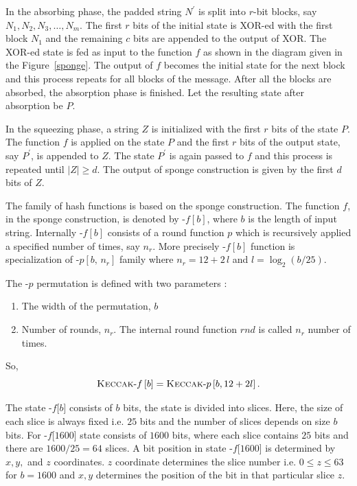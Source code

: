 In the absorbing phase, the padded string $N^\prime$ is split into $r$-bit blocks, say $N_1, N_2, N_3,\ldots,N_m$. The first $r$ bits of the initial state is XOR-ed with the first block $N_1$ and the remaining $c$ bits are appended to the output of XOR. The XOR-ed state is fed as input to the function $f$ as shown in the diagram given in the Figure~\ref{sponge}. The output of $f$ becomes the initial state for the next block and this process repeats for all blocks of the message. After all the blocks are absorbed, the absorption phase is finished. Let the resulting state after absorption be $P$. 

In the squeezing phase, a string $Z$ is initialized with the first $r$ bits of the state $P$. The function $f$ is applied on the state $P$ and the first $r$ bits of the output state, say $P^\prime$, is appended to $Z$. The state $P^\prime$ is again passed to $f$ and this process is repeated until $|Z| \geq d$. The output of sponge construction is given by the first $d$ bits of $Z$.

The \Keccak{} family of hash functions is based on the sponge construction. The function $f$, in the sponge construction, is denoted by \Keccak-$f\left[b\right]$, where $b$ is the length of input string. Internally \Keccak-$f\left[b\right]$ consists of a round function $p$ which is recursively applied a specified number of times, say $n_r$. More precisely \Keccak-$f\left[b\right]$ function is specialization of \Keccak-$p\left[b,\,n_r\right]$ family where $n_r = 12 + 2\,l$ and $l = \log_2 (b/25)$.

The \KECCAK-$p$ permutation is defined with two parameters :
\begin{enumerate}
    \item The width of the permutation, $b$
    \item Number of rounds, $n_r$. The internal round function $rnd$ is called $n_r$ number of times.
\end{enumerate}

So,
\[
    \mbox{\textsc{Keccak}}\text{-}f\left[b\right] = \mbox{\textsc{Keccak}}\text{-}p\left[b,  12 + 2l\right].
\]

The state \KECCAK-$f$[$b$] consists of $b$ bits, the state is divided into slices. Here, the size of each slice is always fixed i.e. $25$ bits and the number of slices depends on size $b$ bits. For \KECCAK-$f$[$1600$] state consists of $1600$ bits, where each slice contains $25$ bits and there are $1600/25 = 64$ slices. A bit position in state \KECCAK-$f$[$1600$] is determined by $x, y, $ and $z$ coordinates. $z$ coordinate determines the slice number i.e. $0 \leq z \leq 63$ for $b = 1600$ and $x, y$ determines the position of the bit in that particular slice $z$.

